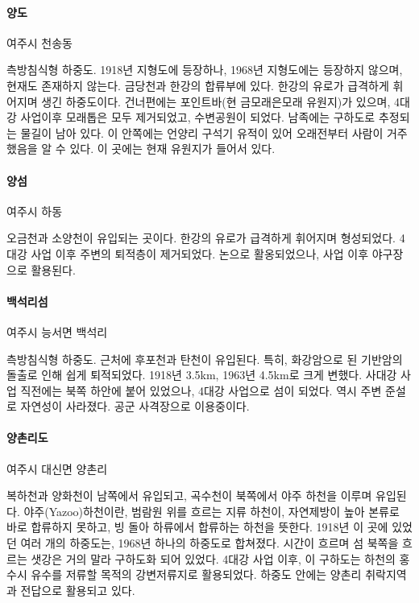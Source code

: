 \paragraph{양도}
여주시 천송동

측방침식형 하중도. 1918년 지형도에 등장하나, 1968년 지형도에는 등장하지 않으며, 현재도 존재하지 않는다.
금당천과 한강의 합류부에 있다.
한강의 유로가 급격하게 휘어지며 생긴 하중도이다. 건너편에는 포인트바(현 금모래은모래 유원지)가 있으며,
4대강 사업이후 모래톱은 모두 제거되었고, 수변공원이 되었다. 남족에는 구하도로 추정되는 물길이 남아 있다.
이 안쪽에는 언양리 구석기 유적이 있어 오래전부터 사람이 거주했음을 알 수 있다.
이 곳에는 현재 유원지가 들어서 있다.
\paragraph{양섬}
여주시 하동

오금천과 소양천이 유입되는 곳이다. 한강의 유로가 급격하게 휘어지며 형성되었다. 4대강 사업 이후 주변의 퇴적층이 제거되었다.
논으로 활옹되었으나, 사업 이후 야구장으로 활용된다.

\paragraph{백석리섬}
여주시 능서면 백석리

측방침식형 하중도. 근처에 후포천과 탄천이 유입된다. 특히, 화강암으로 된 기반암의 돌출로 인해 쉽게 퇴적되었다.
1918년 3.5km, 1963년 4.5km로 크게 변했다. 사대강 사업 직전에는 북쪽 하안에 붙어 있었으나, 4대강 사업으로 섬이 되었다.
역시 주변 준설로 자연성이 사라졌다.
공군 사격장으로 이용중이다.


\paragraph{양촌리도}
여주시 대신면 양촌리

복하천과 양화천이 남쪽에서 유입되고, 곡수천이 북쪽에서 야주 하천을 이루며 유입된다.
야주(Yazoo)하천이란, 범람원 위를 흐르는 지류 하천이, 자연제방이 높아 본류로 바로 합류하지 못하고, 빙 돌아 하류에서 합류하는 하천을 뜻한다.
1918년 이 곳에 있었던 여러 개의 하중도는, 1968년 하나의 하중도로 합쳐졌다. 
시간이 흐르며 섬 북쪽을 흐르는 샛강은 거의 말라 구하도화 되어 있었다.
4대강 사업 이후, 이 구하도는 하천의 홍수시 유수를 저류할 목적의 강변저류지로 활용되었다. 
하중도 안에는 양촌리 취락지역과 전답으로 활용되고 있다. 


